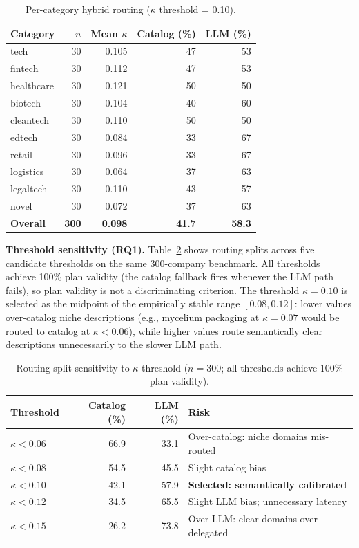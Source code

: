 \documentclass[preprint,12pt]{elsarticle}
\begin{document}
\begin{table}[t]
\centering
\caption{Per-category hybrid routing ($\kappa$ threshold = 0.10).}
\label{tab:routing}
\begin{tabular}{lrrrr}
\toprule
\textbf{Category} & \textbf{$n$} & \textbf{Mean $\kappa$} & \textbf{Catalog (\%)} & \textbf{LLM (\%)} \\
\midrule
tech       & 30 & 0.105 & 47 & 53 \\
fintech    & 30 & 0.112 & 47 & 53 \\
healthcare & 30 & 0.121 & 50 & 50 \\
biotech    & 30 & 0.104 & 40 & 60 \\
cleantech  & 30 & 0.110 & 50 & 50 \\
edtech     & 30 & 0.084 & 33 & 67 \\
retail     & 30 & 0.096 & 33 & 67 \\
logistics  & 30 & 0.064 & 37 & 63 \\
legaltech  & 30 & 0.110 & 43 & 57 \\
novel      & 30 & 0.072 & 37 & 63 \\
\midrule
\textbf{Overall} & \textbf{300} & \textbf{0.098} & \textbf{41.7} & \textbf{58.3} \\
\bottomrule
\end{tabular}
\end{table}

\textbf{Threshold sensitivity (RQ1).}
Table~\ref{tab:sensitivity} shows routing splits across five candidate thresholds
on the same 300-company benchmark. All thresholds achieve 100\% plan validity
(the catalog fallback fires whenever the LLM path fails), so plan validity is
not a discriminating criterion. The threshold $\kappa{=}0.10$ is selected as
the midpoint of the empirically stable range $[0.08, 0.12]$: lower values
over-catalog niche descriptions (e.g., mycelium packaging at $\kappa{=}0.07$
would be routed to catalog at $\kappa{<}0.06$), while higher values
route semantically clear descriptions unnecessarily to the slower LLM path.

\begin{table}[t]
\centering
\caption{Routing split sensitivity to $\kappa$ threshold ($n{=}300$;
  all thresholds achieve 100\% plan validity).}
\label{tab:sensitivity}
\begin{tabular}{lrrp{4.8cm}}
\toprule
\textbf{Threshold} & \textbf{Catalog (\%)} & \textbf{LLM (\%)} & \textbf{Risk} \\
\midrule
$\kappa < 0.06$ & 66.9 & 33.1 & Over-catalog: niche domains mis-routed \\
$\kappa < 0.08$ & 54.5 & 45.5 & Slight catalog bias \\
$\kappa < 0.10$ & 42.1 & 57.9 & \textbf{Selected: semantically calibrated} \\
$\kappa < 0.12$ & 34.5 & 65.5 & Slight LLM bias; unnecessary latency \\
$\kappa < 0.15$ & 26.2 & 73.8 & Over-LLM: clear domains over-delegated \\
\bottomrule
\end{tabular}
\end{table}
\end{document}
